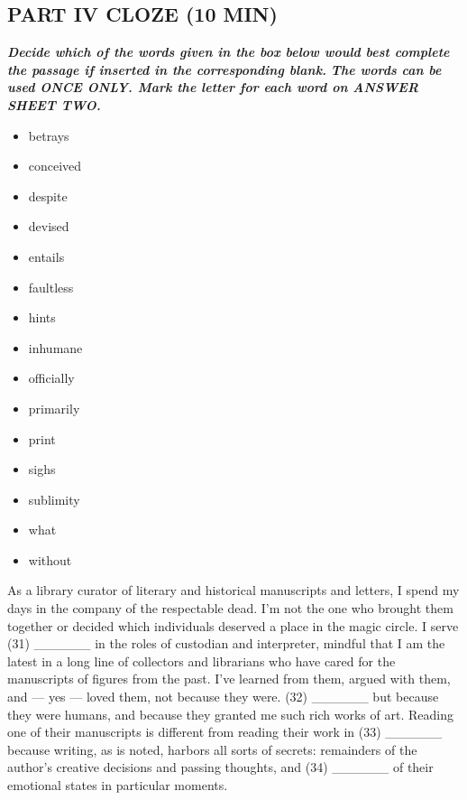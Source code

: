 \documentclass[UTF8,11pt]{ctexart}
\begin{document}
\subsection*{\textbf{PART IV CLOZE (10 MIN)}}


\textbf{\textit{Decide which of the words given in the box below would best complete the passage if inserted in the corresponding blank.}} \textbf{\textit{The words can be used ONCE ONLY. Mark the letter for each word on ANSWER SHEET TWO.}}


\begin{itemize}[leftmargin=2em,itemsep=.2em,topsep=.4em]\item[A.] betrays
\item[B.] conceived
\item[C.] despite
\item[D.] devised
\item[E.] entails
\item[F.] faultless
\item[G.] hints
\item[H.] inhumane
\item[I.] officially
\item[J.] primarily
\item[K.] print
\item[L.] sighs
\item[M.] sublimity
\item[N.] what
\item[O.] without
\end{itemize}

As a library curator of literary and historical manuscripts and letters, I spend my days in the company of the respectable dead. I’m not the one who brought them together or decided which individuals deserved a place in the magic circle. I serve (31) \_\_\_\_\_\_ in the roles of custodian and interpreter, mindful that I am the latest in a long line of collectors and librarians who have cared for the manuscripts of figures from the past. I’ve learned from them, argued with them, and — yes — loved them, not because they were. (32) \_\_\_\_\_\_ but because they were humans, and because they granted me such rich works of art. Reading one of their manuscripts is different from reading their work in (33) \_\_\_\_\_\_ because writing, as is noted, harbors all sorts of secrets: remainders of the author’s creative decisions and passing thoughts, and (34) \_\_\_\_\_\_ of their emotional states in particular moments.
\end{document}
